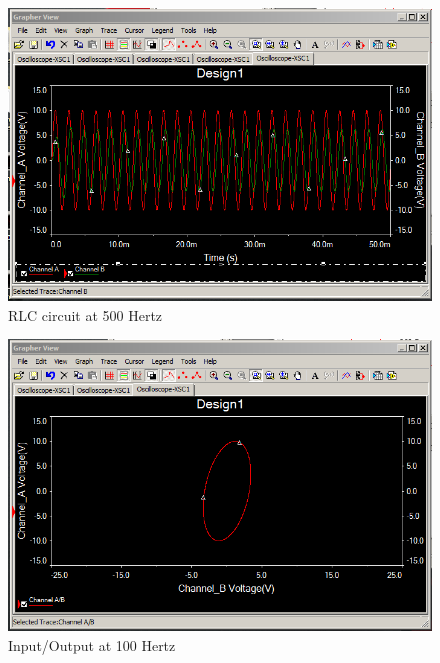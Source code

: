\documentclass[12pt]{article}
\begin{document}
\begin{figure}[h!] %
   \centering
   \includegraphics[width=5in]{500hz.PNG} 
   \caption{RLC circuit at 500 Hertz}
   \label{fig:example}
\end{figure}

\newpage

\begin{figure}[h!] %
   \centering
   \includegraphics[width=5in]{100hz_ab.PNG} 
   \caption{Input/Output at 100 Hertz}
   \label{fig:example}
\end{figure}
\bigskip
\end{document}
